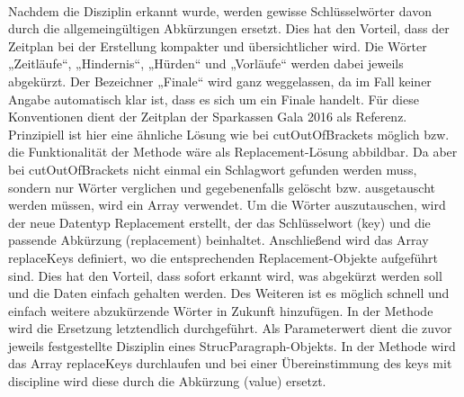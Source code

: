 \\
Nachdem die Disziplin erkannt wurde, werden gewisse Schlüsselwörter davon durch die allgemeingültigen Abkürzungen ersetzt. Dies hat den Vorteil, dass der Zeitplan bei der Erstellung kompakter und übersichtlicher wird. Die Wörter „Zeitläufe“, „Hindernis“, „Hürden“ und „Vorläufe“ werden dabei jeweils abgekürzt. Der Bezeichner „Finale“ wird ganz weggelassen, da im Fall keiner Angabe automatisch klar ist, dass es sich um ein Finale handelt. Für diese Konventionen dient der Zeitplan der Sparkassen Gala 2016 als Referenz. Prinzipiell ist hier eine ähnliche Lösung wie bei cutOutOfBrackets möglich bzw. die Funktionalität der Methode wäre als Replacement-Lösung abbildbar. Da aber bei cutOutOfBrackets nicht einmal ein Schlagwort gefunden werden muss, sondern nur Wörter verglichen und gegebenenfalls gelöscht bzw. ausgetauscht werden müssen, wird ein Array verwendet. Um die Wörter auszutauschen, wird der neue Datentyp Replacement erstellt, der das Schlüsselwort (key) und die passende Abkürzung (replacement) beinhaltet. Anschließend wird das Array replaceKeys definiert, wo die entsprechenden Replacement-Objekte aufgeführt sind. Dies hat den Vorteil, dass sofort erkannt wird, was abgekürzt werden soll und die Daten einfach gehalten werden. Des Weiteren ist es möglich schnell und einfach weitere abzukürzende Wörter in Zukunft hinzufügen. In der Methode wird die Ersetzung letztendlich durchgeführt. Als Parameterwert dient die zuvor jeweils festgestellte Disziplin eines StrucParagraph-Objekts. In der Methode wird das Array replaceKeys durchlaufen und bei einer Übereinstimmung des keys mit discipline wird diese durch die Abkürzung (value) ersetzt.

